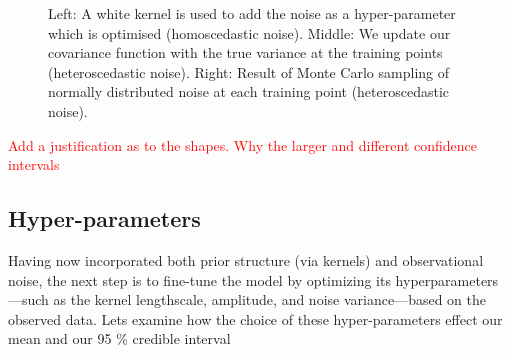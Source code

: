 \documentclass{article}
\begin{document}
\begin{figure}[H]
\begin{subfigure}[b]{0.3\textwidth}
    \end{subfigure}
    \caption{
    Left: A white kernel is used to add the noise as a hyper-parameter which is optimised (homoscedastic noise). 
    Middle: We update our covariance function with the true variance at the training points (heteroscedastic noise). 
    Right: Result of Monte Carlo sampling of normally distributed noise at each training point (heteroscedastic noise).
    }
\end{figure}

\textcolor{red}{Add a justification as to the shapes. Why the larger and different confidence intervals}


\subsection{Hyper-parameters}
\label{sec: Hyper_parameters}

\bigskip

\noindent
Having now incorporated both prior structure (via kernels) and observational noise, the next step is to fine-tune the model by optimizing its hyperparameters—such as the kernel lengthscale, amplitude, and noise variance—based on the observed data.
Lets examine how the choice of these hyper-parameters effect our mean and our 95 \% credible interval
\end{document}
